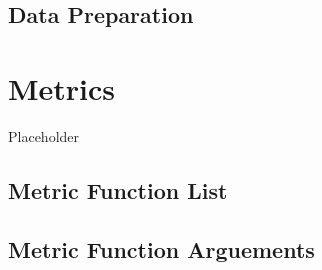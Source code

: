 \documentclass[
]{book}
\begin{document}
\hypertarget{data-preparation}{%
\section{Data Preparation}\label{data-preparation}}

\hypertarget{metrics}{%
\chapter{Metrics}\label{metrics}}

Placeholder

\hypertarget{metric-function-list}{%
\section{Metric Function List}\label{metric-function-list}}

\hypertarget{metric-function-arguements}{%
\section{Metric Function Arguements}\label{metric-function-arguements}}
\end{document}
